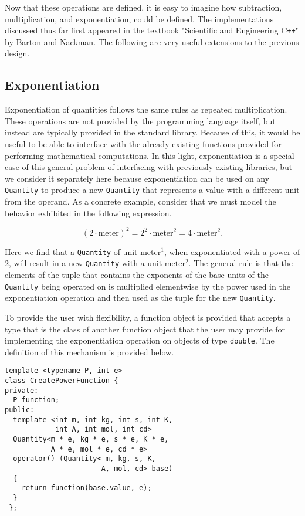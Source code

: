 \documentclass[reprint]{revtex4-1}
\begin{document}
Now that these operations are defined, it is easy to imagine how subtraction, multiplication,
and exponentiation, could be defined. The implementations discussed thus far first appeared in the
textbook "Scientific and Engineering C\verb!++!" by Barton and Nackman.
The following are very useful extensions to the previous design.

\subsection{Exponentiation}

Exponentiation of quantities follows the same rules as repeated multiplication. These operations
are not provided by the programming language itself, but instead are typically provided in the standard library.
Because of this, it would be useful to be able to interface with the already existing functions provided for
performing mathematical computations. In this light, exponentiation is a special case of this general
problem of interfacing with previously existing libraries, but we consider it separately here because
exponentiation can be used on any \verb|Quantity| to produce a new \verb|Quantity| that represents a value with
a different unit from the operand. As a concrete example, consider that we must model the behavior
exhibited in the following expression.

\begin{equation*}
  \left( 2 \cdot \text{meter} \right)^2 = 2^2 \cdot \text{meter}^2 = 4 \cdot \text{meter}^2.
\end{equation*}

Here we find that a \verb|Quantity| of unit $\text{meter}^1$, when exponentiated with a power of $2$, will result in
a new \verb|Quantity| with a unit $\text{meter}^2$. The general rule is that the elements of the tuple that contains
the exponents of the base units of the \verb|Quantity| being operated on is multiplied elementwise by the power used
in the exponentiation operation and then used as the tuple for the new \verb|Quantity|.

To provide the user with flexibility, a function object is provided that accepts a type that is the class
of another function object that the user may provide for implementing the exponentiation operation on objects
of type \verb|double|. The definition of this mechanism is provided below.

\begin{verbatim}
template <typename P, int e>
class CreatePowerFunction {
private:
  P function;
public:
  template <int m, int kg, int s, int K,
            int A, int mol, int cd>
  Quantity<m * e, kg * e, s * e, K * e,
           A * e, mol * e, cd * e>
  operator() (Quantity< m, kg, s, K,
                       A, mol, cd> base)
  {
    return function(base.value, e);
  }
 };
\end{verbatim}
\end{document}
